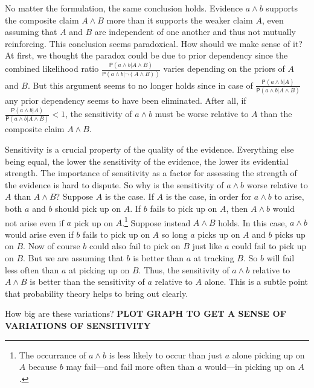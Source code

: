 \documentclass[
  10pt,
  dvipsnames,enabledeprecatedfontcommands]{scrartcl}
\newcommand{\pr}[1]{\mathsf{P}(#1)}
\begin{document}
No matter the formulation, the same conclusion holds. Evidence
\(a\wedge b\) supports the composite claim \(A\wedge B\) more than it
supports the weaker claim \(A\), even assuming that \(A\) and \(B\) are
independent of one another and thus not mutually reinforcing. This
conclusion seems paradoxical. How should we make sense of it? At first,
we thought the paradox could be due to prior dependency since the
combined likelihood ratio
\(\frac{\pr{a\wedge b \vert A \wedge B}}{\pr{a\wedge b \vert \neg (A \wedge B)}}\)
varies depending on the priors of \(A\) and \(B\). But this argument
seems to no longer holds since in case of
\(\frac{\pr{a\wedge b \vert A}}{\pr{a\wedge b \vert A \wedge B}}\) any
prior dependency seems to have been eliminated. After all, if
\(\frac{\pr{a\wedge b \vert A}}{\pr{a\wedge b \vert A \wedge B}}<1\),
the sensitivity of \(a\wedge b\) must be worse relative to \(A\) than
the composite claim \(A \wedge B\).

Sensitivity is a crucial property of the quality of the evidence.
Everything else being equal, the lower the sensitivity of the evidence,
the lower its evidential strength. The importance of sensitivity as a
factor for assessing the strength of the evidence is hard to dispute. So
why is the sensitivity of \(a\wedge b\) worse relative to \(A\) than
\(A \wedge B\)? Suppose \(A\) is the case. If \(A\) is the case, in
order for \(a\wedge b\) to arise, both \(a\) and \(b\) should pick up on
\(A\). If \(b\) fails to pick up on \(A\), then \(A \wedge b\) would not
arise even if \(a\) pick up on
\(A\).\footnote{The occurrance of $a\wedge b$ is less likely to occur than just $a$ alone picking up on $A$ because $b$ may fail---and fail more often than $a$ would---in picking up on $A$.}
Suppose instead \(A\wedge B\) holds. In this case, \(a\wedge b\) would
arise even if \(b\) fails to pick up on \(A\) so long \(a\) picks up on
\(A\) and \(b\) picks up on \(B\). Now of course \(b\) could also fail
to pick on \(B\) just like \(a\) could fail to pick up on \(B\). But we
are assuming that \(b\) is better than \(a\) at tracking \(B\). So \(b\)
will fail less often than \(a\) at picking up on \(B\). Thus, the
sensitivity of \(a\wedge b\) relative to \(A\wedge B\) is better than
the sensitivity of \(a\) relative to \(A\) alone. This is a subtle point
that probability theory helps to bring out clearly.

How big are these variations?
\textbf{PLOT GRAPH TO GET A SENSE OF VARIATIONS OF SENSITIVITY}
\end{document}

